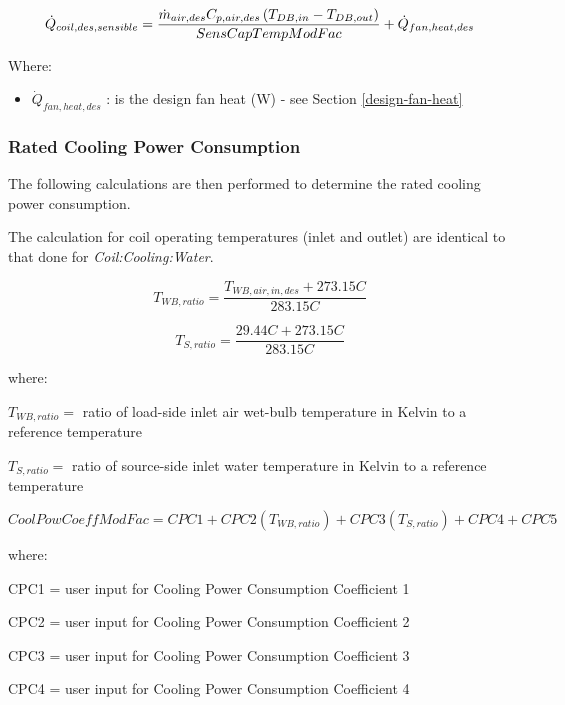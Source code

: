 \begin{equation}
  \dot{Q}_{coil,des,sensible} = \frac{\dot{m}_{air,des}C_{p,air,des}\PB{T_{DB,in}-T_{DB,out}}}{SensCapTempModFac} +\dot{Q}_{fan,heat,des}
\end{equation}

Where:

\begin{itemize}
\item
  \(\dot{Q}_{fan,heat,des}\) : is the design fan heat (W) - see Section \ref{design-fan-heat}
\end{itemize}

\subsubsection{Rated Cooling Power Consumption}\label{rated-cooling-power-consumption}

The following calculations are then performed to determine the rated cooling power consumption.

The calculation for coil operating temperatures (inlet and outlet) are identical to that done for \emph{Coil:Cooling:Water}. 

\begin{equation}
  T_{WB,ratio} = \frac{T_{WB,air,in,des}+273.15C}{283.15C}
\end{equation}

\begin{equation}
  T_{S,ratio} = \frac{29.44C+273.15C}{283.15C}
\end{equation}

where:

$T_{WB,ratio} = $ ratio of load-side inlet air wet-bulb temperature in Kelvin to a reference temperature

$T_{S,ratio} = $ ratio of source-side inlet water temperature in Kelvin to a reference temperature

\begin{equation}
	CoolPowCoeffModFac = CPC1 + CPC2 (T_{WB,ratio})+CPC3(T_{S,ratio})+CPC4+CPC5
\end{equation}

where:

CPC1 = user input for Cooling Power Consumption Coefficient 1

CPC2 = user input for Cooling Power Consumption Coefficient 2

CPC3 = user input for Cooling Power Consumption Coefficient 3

CPC4 = user input for Cooling Power Consumption Coefficient 4

